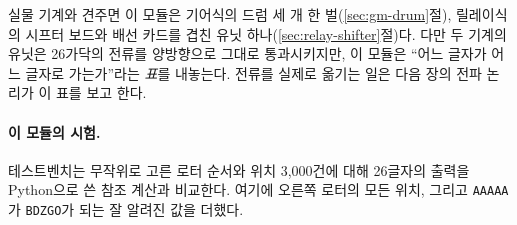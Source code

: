 \Ours 실물 기계와 견주면 이 모듈은 기어식의 드럼 세 개 한 벌(\ref{sec:gm-drum}절), 릴레이식의 시프터 보드와
배선 카드를 겹친 유닛 하나(\ref{sec:relay-shifter}절)다. 다만 두 기계의 유닛은 26가닥의 전류를 양방향으로
그대로 통과시키지만, 이 모듈은 ``어느 글자가 어느 글자로 가는가''라는 \emph{표}를 내놓는다. 전류를 실제로
옮기는 일은 다음 장의 전파 논리가 이 표를 보고 한다.

\paragraph{이 모듈의 시험.} 테스트벤치는 무작위로 고른 로터 순서와 위치 3,000건에 대해 26글자의 출력을
Python으로 쓴 참조 계산과 비교한다. 여기에 오른쪽 로터의 모든 위치, 그리고 \texttt{AAAAA}가 \texttt{BDZGO}가
되는 잘 알려진 값을 더했다.
